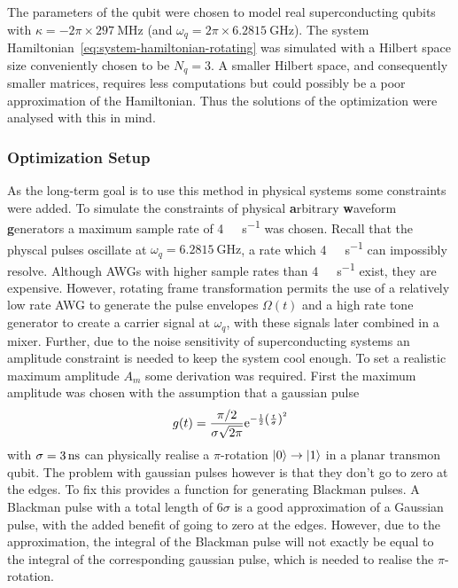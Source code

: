 \documentclass[main.tex]{subfiles}
\begin{document}
The parameters of the qubit were chosen to model real superconducting qubits with \( \kappa = -2\pi\times\SI{297}{\mega\hertz} \) (and \( \omega_{q} = 2\pi\times\SI{6.2815}{\giga\hertz} \)).
The system Hamiltonian~\eqref{eq:system-hamiltonian-rotating} was simulated with a Hilbert space size conveniently chosen to be \( N_q = 3 \).
A smaller Hilbert space, and consequently smaller matrices, requires less computations but could possibly be a poor approximation of the Hamiltonian.
Thus the solutions of the optimization were analysed with this in mind.

\subsubsection{Optimization Setup}
As the long-term goal is to use this method in physical systems some constraints were added.
To simulate the constraints of physical \textbf{a}rbitrary \textbf{w}aveform \textbf{g}enerators a maximum sample rate of \SI{4}{\giga\samples\per\second} was chosen.
Recall that the physcal pulses oscillate at \( \omega_{q} = \SI{6.2815}{\giga\hertz} \), a rate which \SI{4}{\giga\samples\per\second} can impossibly resolve.
Although AWGs with higher sample rates than \SI{4}{\giga\samples\per\second} exist, they are expensive.
However, rotating frame transformation permits the use of a relatively low rate AWG to generate the pulse envelopes \( \Omega(t) \) and a high rate tone generator to create a carrier signal at \( \omega_{q} \), with these signals later combined in a mixer.
Further, due to the noise sensitivity of superconducting systems an amplitude constraint is needed to keep the system cool enough.
To set a realistic maximum amplitude \( A_m \) some derivation was required.
First the maximum amplitude was chosen with the assumption that a gaussian pulse
\begin{equation}
    g(t) = \frac{\pi/2}{\sigma\sqrt{2\pi}} \mathrm{e}^{-\frac{1}{2}\qty(\frac{t}{\sigma})^2}
\end{equation}
with \( \sigma = \SI{3}{\nano\second} \) can physically realise a \(\pi\)-rotation \( \ket{0} \rightarrow \ket{1} \) in a planar transmon qubit.
The problem with gaussian pulses however is that they don't go to zero at the edges.
To fix this \krotov{} provides a function for generating Blackman pulses.
A Blackman pulse with a total length of \(6\sigma\) is a good approximation of a Gaussian pulse, with the added benefit of going to zero at the edges.
However, due to the approximation, the integral of the Blackman pulse will not exactly be equal to the integral of the corresponding gaussian pulse, which is needed to realise the \(\pi\)-rotation.
\end{document}
